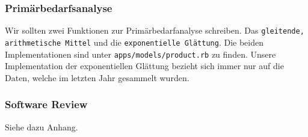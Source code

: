 \subsubsection{Prim\"arbedarfsanalyse}
Wir sollten zwei Funktionen zur Prim\"arbedarfanalyse schreiben. Das \texttt{gleitende, arithmetische Mittel} und die \texttt{exponentielle Gl\"attung}. Die beiden Implementationen sind unter \texttt{apps/models/product.rb} zu finden. Unsere Implementation der exponentiellen Gl\"attung bezieht sich immer nur auf die Daten, welche im letzten Jahr gesammelt wurden.

\subsubsection{Software Review}
Siehe dazu Anhang.
